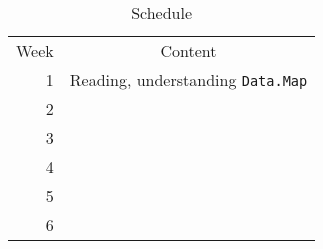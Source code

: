 \documentclass[a4paper,UKenglish,cleveref, autoref, thm-restate]{template/lipics-v2021}
\begin{document}
\begin{table}[h!]
    \centering
    \begin{tabular}{ r | c }
        Week & Content \\
        1 & Reading, understanding \texttt{Data.Map} \\
        2 &  \\
        3 &  \\
        4 &  \\
        5 &  \\
        6 &  \\
    \end{tabular}
    \caption{Schedule}
    \label{tab:schedule}
\end{table}



\end{document}
